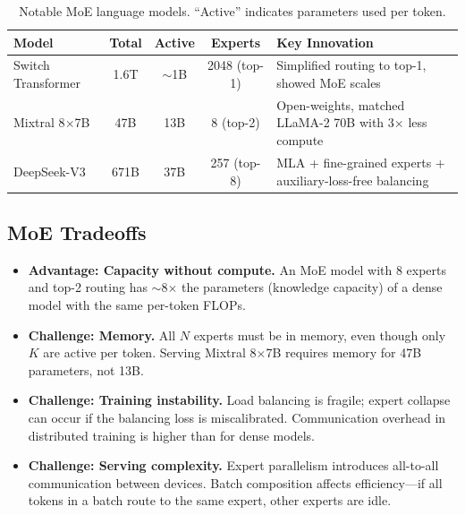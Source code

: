 \begin{table}[H]
\centering
\small
\begin{tabularx}{\textwidth}{@{}l c c c X@{}}
\toprule
\textbf{Model} & \textbf{Total} & \textbf{Active} & \textbf{Experts}
& \textbf{Key Innovation} \\
\midrule
Switch Transformer & 1.6T & $\sim$1B & 2048 (top-1)
  & Simplified routing to top-1, showed MoE scales \\
Mixtral 8$\times$7B & 47B & 13B & 8 (top-2)
  & Open-weights, matched LLaMA-2 70B with 3$\times$ less compute \\
DeepSeek-V3 & 671B & 37B & 257 (top-8)
  & MLA + fine-grained experts + auxiliary-loss-free balancing \\
\bottomrule
\end{tabularx}
\caption{Notable MoE language models.  ``Active'' indicates parameters used
per token.}
\label{tab:moe_models}
\end{table}

\subsection{MoE Tradeoffs}

\begin{itemize}[leftmargin=*]
\item \textbf{Advantage: Capacity without compute.}  An MoE model with 8
  experts and top-2 routing has $\sim$8$\times$ the parameters (knowledge
  capacity) of a dense model with the same per-token FLOPs.

\item \textbf{Challenge: Memory.}  All $N$ experts must be in memory, even
  though only $K$ are active per token.  Serving Mixtral 8$\times$7B requires
  memory for 47B parameters, not 13B.

\item \textbf{Challenge: Training instability.}  Load balancing is fragile;
  expert collapse can occur if the balancing loss is miscalibrated.
  Communication overhead in distributed training is higher than for dense
  models.

\item \textbf{Challenge: Serving complexity.}  Expert parallelism introduces
  all-to-all communication between devices.  Batch composition affects
  efficiency---if all tokens in a batch route to the same expert, other
  experts are idle.
\end{itemize}


